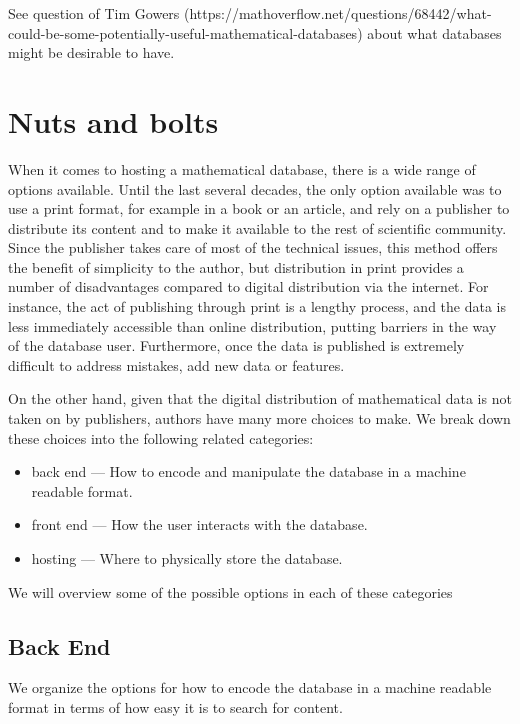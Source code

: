 \documentclass{article}
\begin{document}
See question of Tim Gowers (https://mathoverflow.net/questions/68442/what-could-be-some-potentially-useful-mathematical-databases) about what databases might be desirable to have.

\section{Nuts and bolts}

When it comes to hosting a mathematical database, there is a wide range of options available.
Until the last several decades, the only option available was to use a print format, for example in a book or an article, and rely on a publisher to distribute its content and to make it available to the rest of scientific community.
Since the publisher takes care of most of the technical issues, this method offers the benefit of simplicity to the author, but distribution in print provides a number of disadvantages compared to digital distribution via the internet.
For instance, the act of publishing through print is a lengthy process, and the data is less immediately accessible than online distribution, putting barriers in the way of the database user.
Furthermore, once the data is published is extremely difficult to address  mistakes, add new data or features.

On the other hand, given that the digital distribution of mathematical data is not taken on by publishers, authors have many more choices to make.
We break down these choices into the following related categories:
\begin{itemize}
  \item back end --- How to encode and manipulate the database in a machine readable format.
  \item front end --- How the user interacts with the database.
  \item hosting --- Where to physically store the database.
\end{itemize}
We will overview some of the possible options in each of these categories

\subsection{Back End}

We organize the options for how to encode the database in a machine readable format in terms of how easy it is to search for content.
\end{document}
